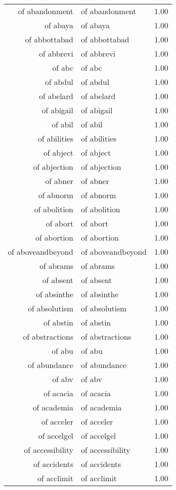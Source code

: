 \begin{table}[ht]
\begin{tabular}{rlr}
  of abandonment & of abandonment & 1.00 \\ 
  of abaya & of abaya & 1.00 \\ 
  of abbottabad & of abbottabad & 1.00 \\ 
  of abbrevi & of abbrevi & 1.00 \\ 
  of abc & of abc & 1.00 \\ 
  of abdul & of abdul & 1.00 \\ 
  of abelard & of abelard & 1.00 \\ 
  of abigail & of abigail & 1.00 \\ 
  of abil & of abil & 1.00 \\ 
  of abilities & of abilities & 1.00 \\ 
  of abject & of abject & 1.00 \\ 
  of abjection & of abjection & 1.00 \\ 
  of abner & of abner & 1.00 \\ 
  of abnorm & of abnorm & 1.00 \\ 
  of abolition & of abolition & 1.00 \\ 
  of abort & of abort & 1.00 \\ 
  of abortion & of abortion & 1.00 \\ 
  of aboveandbeyond & of aboveandbeyond & 1.00 \\ 
  of abrams & of abrams & 1.00 \\ 
  of absent & of absent & 1.00 \\ 
  of absinthe & of absinthe & 1.00 \\ 
  of absolutism & of absolutism & 1.00 \\ 
  of abstin & of abstin & 1.00 \\ 
  of abstractions & of abstractions & 1.00 \\ 
  of abu & of abu & 1.00 \\ 
  of abundance & of abundance & 1.00 \\ 
  of abv & of abv & 1.00 \\ 
  of acacia & of acacia & 1.00 \\ 
  of academia & of academia & 1.00 \\ 
  of acceler & of acceler & 1.00 \\ 
  of accelgel & of accelgel & 1.00 \\ 
  of accessibility & of accessibility & 1.00 \\ 
  of accidents & of accidents & 1.00 \\ 
  of acclimit & of acclimit & 1.00 \\ 

\end{tabular}
\end{table}
